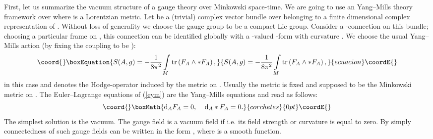 \documentclass[a4paper,12pt,draft]{article}
\providecommand{\R}{{\mathbb R}}
\providecommand{\g}{{\mathfrak g}}
\providecommand{\dd}{{\rm d}}
\providecommand{\tr}{{\rm tr}}
\begin{document}
First, let us summarize the vacuum structure of a gauge theory over 
Minkowski space-time. We are going to use an Yang--Mills theory
framework over \myHighlight{$(\R^4 , g)$}\coordHE{} where \coordHE{} is a Lorentzian metric. Let
\coordHE{} be a (trivial) complex vector bundle over \myHighlight{$\R^4$}\coordHE{} belonging to a finite
dimensional complex representation of \coordHE{}. Without loss of generality we
choose the gauge group \coordHE{} to be a compact Lie group. Consider a
\coordHE{}-connection on this bundle; choosing a particular frame on \coordHE{}, this
connection can be identified globally with a \myHighlight{$\g$}\coordHE{}-valued \coordHE{}-form \coordHE{}
with curvature \coordHE{}. We choose the usual Yang--Mills action (by
fixing the coupling to be \coordHE{}): 
\begin{equation}\coord{}\boxEquation{
S(A,g)=-{1\over 8\pi^2}\int\limits_M\tr\left(F_A\wedge
*F_A\right) ,
\label{eym}
}{
S(A,g)=-{1\over 8\pi^2}\int\limits_M\tr\left(F_A\wedge
*F_A\right) ,
}{ecuacion}\coordE{}\end{equation}
in this case \myHighlight{$M=\R^4$}\coordHE{} and \myHighlight{$*$}\coordHE{} denotes the Hodge-operator
induced by the metric \coordHE{} on \myHighlight{$\R^4$}\coordHE{}. Usually the metric \coordHE{} is fixed and
supposed to be the Minkowski metric on \myHighlight{$\R^4$}\coordHE{}. The 
Euler--Lagrange equations of (\ref{eym}) are the Yang--Mills equations
and read as follows: 
\[\coord{}\boxMath{\dd_AF_A=0,\:\:\:\:\:\dd_A*F_A=0.}{corchetes}{0pt}\coordE{}\]
The simplest solution is the vacuum. The gauge field \coordHE{} is a vacuum field
if \coordHE{} i.e. 
its field strength or curvature is equal to zero. By simply connectedness
of \myHighlight{$\R^4$}\coordHE{} such gauge fields can be written in the form 
\myHighlight{$A=f^{-1}\dd f$}\coordHE{}, where \myHighlight{$f: \R^4\rightarrow G$}\coordHE{} is a smooth function.
\end{document}

